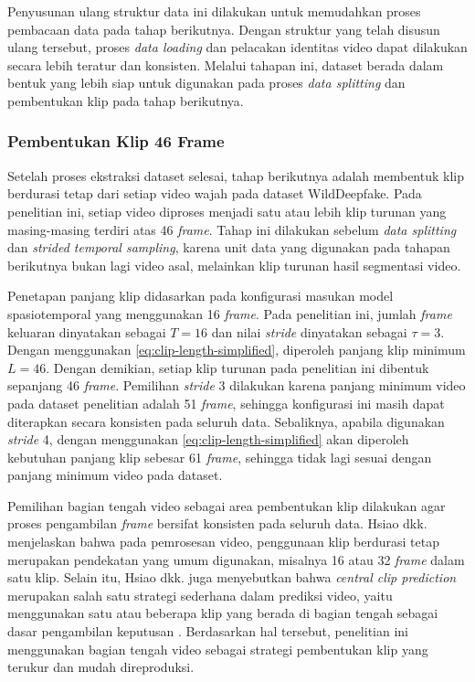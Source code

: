 Penyusunan ulang struktur data ini dilakukan untuk memudahkan proses pembacaan data pada tahap berikutnya. Dengan struktur yang telah disusun ulang tersebut, proses \textit{data loading} dan pelacakan identitas video dapat dilakukan secara lebih teratur dan konsisten. Melalui tahapan ini, dataset berada dalam bentuk yang lebih siap untuk digunakan pada proses \textit{data splitting} dan pembentukan klip pada tahap berikutnya. \par

\subsubsection{Pembentukan Klip 46 Frame}
Setelah proses ekstraksi dataset selesai, tahap berikutnya adalah membentuk klip berdurasi tetap dari setiap video wajah pada dataset WildDeepfake. Pada penelitian ini, setiap video diproses menjadi satu atau lebih klip turunan yang masing-masing terdiri atas 46 \textit{frame}. Tahap ini dilakukan sebelum \textit{data splitting} dan \textit{strided temporal sampling}, karena unit data yang digunakan pada tahapan berikutnya bukan lagi video asal, melainkan klip turunan hasil segmentasi video. \par

Penetapan panjang klip didasarkan pada konfigurasi masukan model spasiotemporal yang menggunakan 16 \textit{frame}. Pada penelitian ini, jumlah \textit{frame} keluaran dinyatakan sebagai $T = 16$ dan nilai \textit{stride} dinyatakan sebagai $\tau = 3$. Dengan menggunakan \ref{eq:clip-length-simplified}, diperoleh panjang klip minimum $L = 46$. Dengan demikian, setiap klip turunan pada penelitian ini dibentuk sepanjang 46 \textit{frame}. Pemilihan \textit{stride} 3 dilakukan karena panjang minimum video pada dataset penelitian adalah 51 \textit{frame}, sehingga konfigurasi ini masih dapat diterapkan secara konsisten pada seluruh data. Sebaliknya, apabila digunakan \textit{stride} 4, dengan menggunakan \ref{eq:clip-length-simplified} akan diperoleh kebutuhan panjang klip sebesar 61 \textit{frame}, sehingga tidak lagi sesuai dengan panjang minimum video pada dataset. \par

Pemilihan bagian tengah video sebagai area pembentukan klip dilakukan agar proses pengambilan \textit{frame} bersifat konsisten pada seluruh data. Hsiao dkk. menjelaskan bahwa pada pemrosesan video, penggunaan klip berdurasi tetap merupakan pendekatan yang umum digunakan, misalnya 16 atau 32 \textit{frame} dalam satu klip. Selain itu, Hsiao dkk. juga menyebutkan bahwa \textit{central clip prediction} merupakan salah satu strategi sederhana dalam prediksi video, yaitu menggunakan satu atau beberapa klip yang berada di bagian tengah sebagai dasar pengambilan keputusan \cite{hsiao2021gcfnetgatedclipfusion}. Berdasarkan hal tersebut, penelitian ini menggunakan bagian tengah video sebagai strategi pembentukan klip yang terukur dan mudah direproduksi. \par

